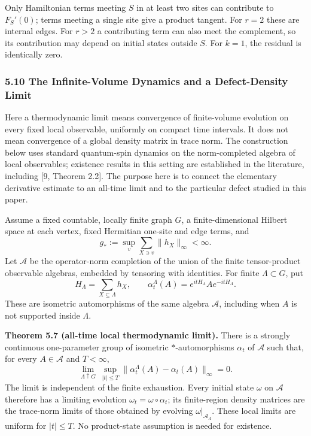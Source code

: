 \documentclass[
  11pt,
]{article}
\begin{document}
Only Hamiltonian terms meeting \(S\) in at least two sites can contribute
to \(F_S'(0)\); terms meeting a single site give a product tangent.
For \(r=2\) these are internal edges. For \(r>2\) a contributing term can
also meet the complement, so its contribution may depend on initial
states outside \(S\). For \(k=1\), the residual is identically zero.

\subsubsection{5.10 The Infinite-Volume Dynamics and a Defect-Density Limit}\label{the-infinite-volume-dynamics-and-a-defect-density-limit}

Here a thermodynamic limit means convergence of finite-volume evolution
on every fixed local observable, uniformly on compact time intervals.
It does not mean convergence of a global density matrix in trace norm.
The construction below uses standard quantum-spin dynamics on the
norm-completed algebra of local observables; existence results in this
setting are established in the literature, including {[}9, Theorem 2.2{]}.
The purpose here is to connect the elementary derivative estimate to
an all-time limit and to the particular defect studied in this paper.

Assume a fixed countable, locally finite graph \(G\), a finite-dimensional
Hilbert space at each vertex, fixed Hermitian one-site and edge terms,
and
\[
 g_*:=\sup_v\sum_{X\ni v}\lVert h_X\rVert_\infty<\infty.
\]
Let \(\mathcal A\) be the operator-norm completion of the union of the
finite tensor-product observable algebras, embedded by tensoring with
identities. For finite \(\Lambda\subset G\), put
\[
 H_\Lambda=\sum_{X\subseteq\Lambda}h_X,\qquad
 \alpha_t^\Lambda(A)=e^{itH_\Lambda}Ae^{-itH_\Lambda}.
\]
These are isometric automorphisms of the same algebra \(\mathcal A\),
including when \(A\) is not supported inside \(\Lambda\).

\textbf{Theorem 5.7 (all-time local thermodynamic limit).} There is a strongly
continuous one-parameter group of isometric \(*\)-automorphisms
\(\alpha_t\) of \(\mathcal A\) such that, for every \(A\in\mathcal A\)
and \(T<\infty\),
\[
 \lim_{\Lambda\uparrow G}\ \sup_{|t|\leq T}
 \lVert \alpha_t^\Lambda(A)-\alpha_t(A)\rVert_\infty=0.
\]
The limit is independent of the finite exhaustion. Every initial state
\(\omega\) on \(\mathcal A\) therefore has a limiting evolution
\(\omega_t=\omega\circ\alpha_t\); its finite-region density matrices are
the trace-norm limits of those obtained by evolving
\(\omega|_{\mathcal A_\Lambda}\). These local limits are uniform for
\(|t|\leq T\). No product-state assumption is needed for existence.
\end{document}
